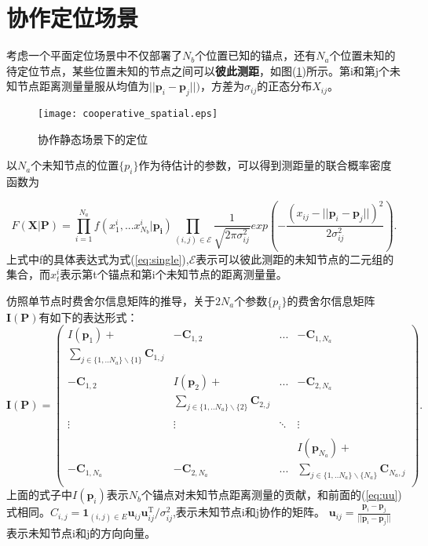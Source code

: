\section[协作定位场景]{协作定位场景}\label{section:cooperative_localization}

考虑一个平面定位场景中不仅部署了$N_b$个位置已知的锚点，还有$N_a$个位置未知的待定位节点，某些位置未知的节点之间可以\textbf{彼此测距}，如图(\ref{fig:cooperative_spatial})所示。第i和第j个未知节点距离测量量服从均值为$||\bm{p}_i-\bm{p}_j||)$，方差为$\sigma_{ij}$的正态分布$X_{ij}$。
        \begin{figure}
          \centering
          \texttt{[image: cooperative\_spatial.eps]}
          \caption{协作静态场景下的定位}\label{fig:cooperative_spatial}
        \end{figure}

以$N_a$个未知节点的位置$\{p_i\}$作为待估计的参数，可以得到测距量的联合概率密度函数为

\begin{equation}
F(\bm{X}|\bm{P})=\prod_{i=1}^{N_a} f(x^i_1,...x^{i}_{N_b}|\bm{p_i})\prod_{(i,j)\in \mathcal{E}}\frac{1}{\sqrt{2\pi\sigma_{ij}^2}}exp\left(-\frac{(x_{ij}-||\bm{p}_i-\bm{p}_j||)^2}{2\sigma_{ij}^2}\right).
\end{equation}
上式中f的具体表达式为式(\ref{eq:single}),$\mathcal{E}$表示可以彼此测距的未知节点的二元组的集合，而$x_t^i$表示第t个锚点和第i个未知节点的距离测量量。


仿照单节点时费舍尔信息矩阵的推导，关于$2N_a$个参数$\{p_i\}$的费舍尔信息矩阵$\bm{I}(\bm{P})$有如下的表达形式：
\begin{equation}\label{eq:general_fim}
\bm{I}(\bm{P})=
\left(
\begin{array}{cccc}
I(\bm{p}_1)+&-\bm{C}_{1,2}&...&-\bm{C}_{1,N_a}\\
\sum_{j\in \{1,..N_a\}\backslash\{1\}}\bm{C}_{1,j}&&&\\
&&&\\
-\bm{C}_{1,2} & I(\bm{p}_2)+
&...&-\bm{C}_{2,N_a}\\
&\sum_{j\in \{1,..N_a\}\backslash \{2\}}\bm{C}_{2,j}&&\\
&&&\\
\vdots &\vdots&\ddots &\vdots\\
&&&\\
&&&I(\bm{p}_{N_a})+\\
-\bm{C}_{1,N_a}&-\bm{C}_{2,N_a}&...& \sum_{j\in \{1,..N_a\}\backslash\{N_a\}}\bm{C}_{N_a,j}\\
\end{array}
\right).
\end{equation}
上面的式子中$I(\bm{p}_i)$表示$N_b$个锚点对未知节点距离测量的贡献，和前面的(\ref{eq:uu})式相同。$C_{i,j}=\bm{1}_{(i,j)\in E}\bm{u}_{ij}\bm{u}_{ij}^{\textrm{T}} /\sigma^2_{ij}$,表示未知节点i和j协作的矩阵。
$\bm{u}_{ij}=\frac{\bm{p}_i-\bm{p}_j}{||\bm{p}_i-\bm{p}_j||}$表示未知节点i和j的方向向量。
